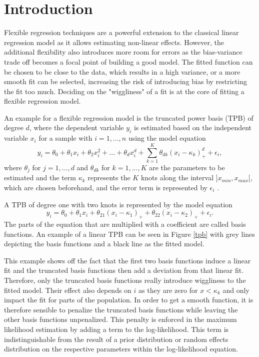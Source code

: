 \documentclass[12pt]{article}
\begin{document}
\begin{titlepage}
\clearpage
\end{titlepage}

\setcounter{page}{2}
\tableofcontents
\clearpage

\section{Introduction}\label{intro}

Flexible regression techniques are a powerful extension to the classical linear regression model as it allows estimating non-linear effects. However, the additional flexibility also introduces more room for errors as the bias-variance trade off becomes a focal point of building a good model. The fitted function can be chosen to be close to the data, which results in a high variance, or a more smooth fit can be selected,  increasing the risk of introducing bias by restricting the fit too much. Deciding on the "wiggliness" of a fit is at the core of fitting a flexible regression model.

An example for a flexible regression model is the truncated power basis (TPB) of degree $d$, where the dependent variable $y_i$ is estimated based on the independent variable $x_i$ for a sample with $i=1,...,n$ using the model equation
$$y_i = 
 \theta_0 + \theta_1x_i + \theta_2x_i^2 + ... + \theta_dx_i^d + \sum_{k=1}^K \theta_{dk}(x_i{-}\kappa_k)_+^d +\epsilon_i,$$
 where $\theta_j$ for $j= 1,...,d$ and $\theta_{dk}$ for $k= 1,...,K$ are the parameters to be estimated and the term $\kappa_k$ represents the $K$ knots along the interval $]x_{min},x_{max}[$, which are chosen beforehand, and the error term is represented by $\epsilon_i$ \cite{ruppert2003semiparametric, wand2003smoothing}.
 
  A TPB of degree one with two knots is represented by the model equation
 $$y_i = 
 \theta_0 + \theta_1x_i +  \theta_{21}(x_i{-}\kappa_1)_+ + \theta_{22}(x_i{-}\kappa_2)_+ + \epsilon_i.$$
 The parts of the equation that are multiplied with a coefficient are called basis functions. 
An example of a linear TPB can be seen in Figure \ref{tpb} with grey lines depicting the basis functions and a black line as the fitted model.
 
This example shows off the fact that the first two basis functions induce a linear fit and the truncated basis functions then add a deviation from that linear fit. Therefore, only the truncated basis functions really introduce wiggliness to the fitted model. 
Their effect also depends on $i$ as they are zero for $x<\kappa_k$ and only impact the fit for parts of the population. 
In order to get a smooth function, it is therefore sensible to penalize the truncated basis functions while leaving the other basis functions unpenalized. This penalty is enforced in the maximum likelihood estimation by adding a term to the log-likelihood. This term is indistinguishable  from the result of a prior distribution or random effects distribution on the respective parameters within the log-likelihood equation. 
\end{document}
